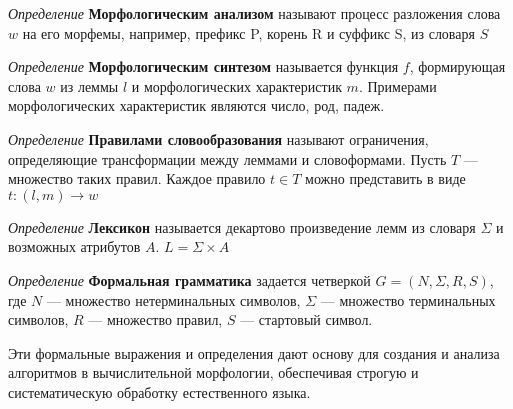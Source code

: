 

\textit{Определение} \textbf{Морфологическим анализом} называют процесс разложения 
слова $w$ на его морфемы, например, префикс P, корень R и суффикс S, из словаря $S$

\textit{Определение} \textbf{Морфологическим синтезом} называется функция $f$,
формирующая слова $w$ из леммы $l$ и морфологических характеристик $m$. 
Примерами морфологических характеристик являются число, род, падеж.
 
\textit{Определение} \textbf{Правилами словообразования} называют ограничения,
 определяющие трансформации между леммами и словоформами. 
 Пусть \( T \) — множество таких правил. Каждое правило \( t \in T \) можно представить в виде
 $t: (l, m) \rightarrow w$

\textit{Определение} \textbf{Лексикон} называется декартово произведение лемм 
из словаря $\Sigma$ и возможных атрибутов $A$. $L = \Sigma \times A$
 

\textit{Определение} \textbf{Формальная грамматика} задается четверкой
$ G  = \left(N, \Sigma, R, S\right)$, где $N$ — множество нетерминальных символов, 
$\Sigma$ — множество терминальных символов, 
$R$ — множество правил, 
$S$ — стартовый символ.
 
 
 Эти формальные выражения и определения дают основу для создания и анализа алгоритмов в вычислительной морфологии, обеспечивая строгую и систематическую обработку естественного языка.
